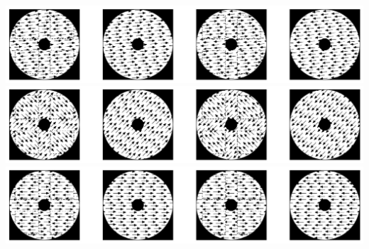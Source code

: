 \documentclass[landscape,final,paperwidth=72in,paperheight=42in,fontscale=0.285]{baposter}
\begin{document}
\begin{poster}
    {
          \centering
          \includegraphics[scale=0.3]{img/mofo-child-tuning-dir5.jpg}
          \includegraphics[scale=0.3]{img/mofo-child-tuning-dir45.jpg}
          \includegraphics[scale=0.3]{img/mofo-child-tuning-dir180.jpg}
    }

\end{poster}
\end{document}
